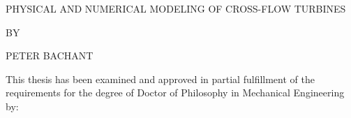 \documentclass[12pt]{unhthesis}
\begin{document}
\thispagestyle{empty}
\mainmatter

\begin{center}
    PHYSICAL AND NUMERICAL MODELING OF CROSS-FLOW TURBINES
    \vspace{6mm}

    BY
    \vspace{6mm}

    PETER BACHANT
    \vspace{6mm}
\end{center}

\noindent \small{This thesis has been examined and approved in partial
fulfillment of the requirements for the degree of Doctor of Philosophy in
Mechanical Engineering by:}

\begin{tabular}{l}

\end{tabular}
\end{document}
